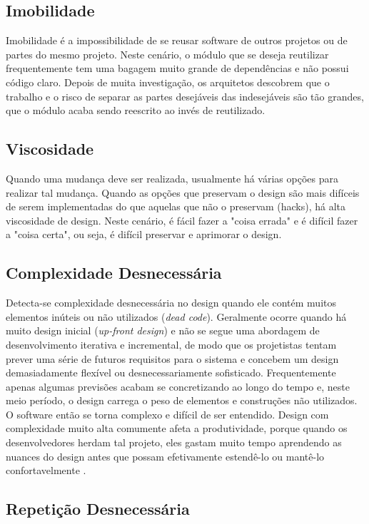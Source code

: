 \subsection{Imobilidade}

Imobilidade é a impossibilidade de se reusar software de outros projetos ou de partes do mesmo projeto. Neste cenário, o módulo que se deseja reutilizar frequentemente tem uma bagagem muito grande de dependências e não possui código claro. Depois de muita investigação, os arquitetos descobrem que o trabalho e o risco de separar as partes desejáveis das indesejáveis são tão grandes, que o módulo acaba sendo reescrito ao invés de reutilizado.

\subsection{Viscosidade}

Quando uma mudança deve ser realizada, usualmente há várias opções para realizar tal mudança. Quando as opções que preservam o design são mais difíceis de serem implementadas do que aquelas que não o preservam (hacks), há alta viscosidade de design. Neste cenário, é fácil fazer a "coisa errada" e é difícil fazer a "coisa certa", ou seja, é difícil preservar e aprimorar o design.

\subsection{Complexidade Desnecessária}

Detecta-se complexidade desnecessária no design quando ele contém muitos elementos inúteis ou não utilizados (\textit{dead code}). Geralmente ocorre quando há muito design inicial (\textit{up-front design}) e não se segue uma abordagem de desenvolvimento iterativa e incremental, de modo que os projetistas tentam prever uma série de futuros requisitos para o sistema e concebem um design demasiadamente flexível ou desnecessariamente sofisticado. Frequentemente apenas algumas previsões acabam se concretizando ao longo do tempo e, neste meio período, o design carrega o peso de elementos e construções não utilizados. O software então se torna complexo e difícil de ser entendido. Design com complexidade muito alta comumente afeta a produtividade, porque quando os desenvolvedores herdam tal projeto, eles gastam muito tempo aprendendo as nuances do design antes que possam efetivamente estendê-lo ou mantê-lo confortavelmente \cite{kerievsky}.

\subsection{Repetição Desnecessária}

